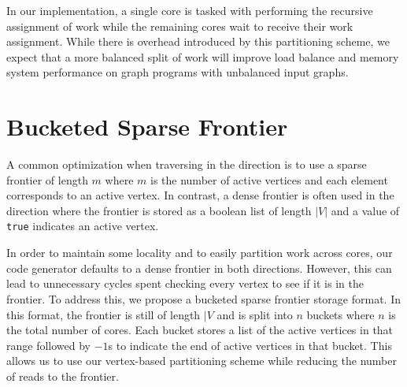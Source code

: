 In our implementation, a single core is tasked with performing the recursive assignment of work while the remaining cores wait to receive their work assignment. 
While there is overhead introduced by this partitioning scheme, we expect that a more balanced split of work will improve load balance and memory system performance on graph programs with unbalanced input graphs.





\section{Bucketed Sparse Frontier}
A common optimization when traversing in the \push direction is to use a sparse frontier of length $m$ where $m$ is the number of active vertices and each element corresponds to an active vertex.
In contrast, a dense frontier is often used in the \pull direction where the frontier is stored as a boolean list of length $|V|$ and a value of \lstinline{true} indicates an active vertex.

In order to maintain some locality and to easily partition work across cores, our code generator defaults to a dense frontier in both directions.
However, this can lead to unnecessary cycles spent checking every vertex to see if it is in the frontier.
To address this, we propose a bucketed sparse frontier storage format. 
In this format, the frontier is still of length $|V$ and is split into $n$ buckets where $n$ is the total number of cores.
Each bucket stores a list of the active vertices in that range followed by $-1$s to indicate the end of active vertices in that bucket.
This allows us to use our vertex-based partitioning scheme while reducing the number of reads to the frontier.

